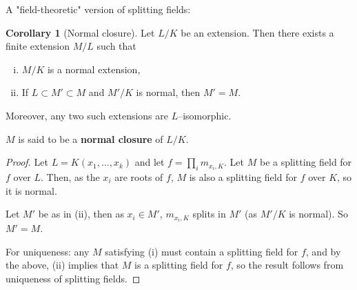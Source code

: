 \documentclass{article}
\theoremstyle{definition}
\newtheorem{cor}[theorem]{Corollary}
\begin{document}
A "field-theoretic" version of splitting fields:
\begin{cor}[Normal closure]
    Let $L/K$ be an extension. Then there exists a finite extension $M/L$ such that 
    \begin{enumerate}[(i)]
        \item $M/K$ is a normal extension,
        \item If $L \subset M' \subset M$ and $M'/K$ is normal, then $M'=M$.
    \end{enumerate}
    Moreover, any two such extensions are $L$--isomorphic.
\end{cor}
$M$ is said to be a \textbf{normal closure} of $L/K$.
\begin{proof}
    Let $L=K(x_1,\ldots,x_k)$ and let $f = \prod_{i}^{} m_{x_i,K}$. Let $M$ be a splitting field for $f$ over $L$. Then, as the $x_i$ are roots of $f$, $M$ is also a splitting field for $f$ over $K$, so it is normal.

    Let $M'$ be as in (ii), then as $x_i \in M'$, $m_{x_i,K}$ splits in $M'$ (as $M'/K$ is normal). So $M'=M$.
    \vspace{1mm}
    
    For uniqueness: any $M$ satisfying (i) must contain a splitting field for $f$, and by the above, (ii) implies that $M$ is a splitting field for $f$, so the result follows from uniqueness of splitting fields.
\end{proof}
\end{document}
